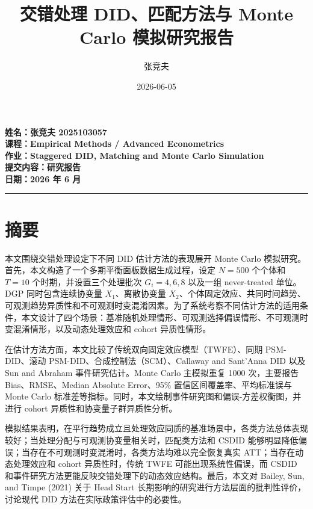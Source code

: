 \documentclass[
  fontset=windows]{ctexart}
\title{交错处理 DID、匹配方法与 Monte Carlo 模拟研究报告}
\author{张竞夫}
\date{2026-06-05}
\renewcommand*\contentsname{Table of contents}
\newcommand\contentsname{Table of contents}
\begin{document}
\maketitle

\renewcommand*\contentsname{Table of contents}
{
\setcounter{tocdepth}{3}
\tableofcontents
}

\textbf{姓名：张竞夫 2025103057}\\
\textbf{课程：Empirical Methods / Advanced Econometrics}\\
\textbf{作业：Staggered DID, Matching and Monte Carlo Simulation}\\
\textbf{提交内容：研究报告}\\
\textbf{日期：2026 年 6 月}

\begin{center}\rule{0.5\linewidth}{0.5pt}\end{center}

\section{摘要}\label{ux6458ux8981}

本文围绕交错处理设定下不同 DID 估计方法的表现展开 Monte Carlo
模拟研究。首先，本文构造了一个多期平衡面板数据生成过程，设定 \(N=500\)
个个体和 \(T=10\) 个时期，并设置三个处理批次 \(G_i=4,6,8\) 以及一组
never-treated 单位。DGP 同时包含连续协变量 \(X_1\)、离散协变量
\(X_2\)、个体固定效应、共同时间趋势、可观测趋势异质性和不可观测时变混淆因素。为了系统考察不同估计方法的适用条件，本文设计了四个场景：基准随机处理情形、可观测选择偏误情形、不可观测时变混淆情形，以及动态处理效应和
cohort 异质性情形。

在估计方法方面，本文比较了传统双向固定效应模型（TWFE）、同期
PSM-DID、滚动 PSM-DID、合成控制法（SCM）、Callaway and Sant'Anna DID
以及 Sun and Abraham 事件研究估计。Monte Carlo 主模拟重复 1000
次，主要报告 Bias、RMSE、Median Absolute Error、95\%
置信区间覆盖率、平均标准误与 Monte Carlo
标准差等指标。同时，本文绘制事件研究图和偏误-方差权衡图，并进行 cohort
异质性和协变量子群异质性分析。

模拟结果表明，在平行趋势成立且处理效应同质的基准场景中，各类方法总体表现较好；当处理分配与可观测协变量相关时，匹配类方法和
CSDID
能够明显降低偏误；当存在不可观测时变混淆时，各类方法均难以完全恢复真实
ATT；当存在动态处理效应和 cohort 异质性时，传统 TWFE
可能出现系统性偏误，而 CSDID
和事件研究方法更能反映交错处理下的动态效应结构。最后，本文对 Bailey,
Sun, and Timpe (2021) 关于 Head Start
长期影响的研究进行方法层面的批判性评价，讨论现代 DID
方法在实际政策评估中的必要性。
\end{document}
